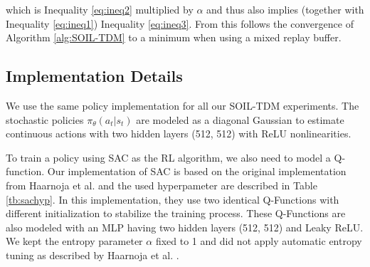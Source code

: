 \documentclass{article}
\begin{document}
which is Inequality \ref{eq:ineq2} multiplied by $\alpha$ and thus also implies (together with Inequality \ref{eq:ineq1}) Inequality \ref{eq:ineq3}. From this follows the convergence of Algorithm \ref{alg:SOIL-TDM} to a minimum when using a mixed replay buffer.

\subsection{Implementation Details}\label{sec:implDet}
We use the same policy implementation for all our SOIL-TDM experiments. The stochastic policies $\pi_{\theta}(a_t|s_t)$ are modeled as a diagonal Gaussian to estimate continuous actions with two hidden layers (512, 512) with ReLU nonlinearities. 

To train a policy using SAC as the RL algorithm, we also need to model a Q-function. Our implementation of SAC is based on the original implementation from Haarnoja et al.  and the used hyperpameter are described in Table \ref{tb:sachyp}. In this implementation, they use two identical Q-Functions with different initialization to stabilize the training process. These Q-Functions are also modeled with an MLP having two hidden layers (512, 512) and Leaky ReLU. We kept the entropy parameter $\alpha$ fixed to 1 and did not apply automatic entropy tuning as described by Haarnoja et al. . 
\end{document}
